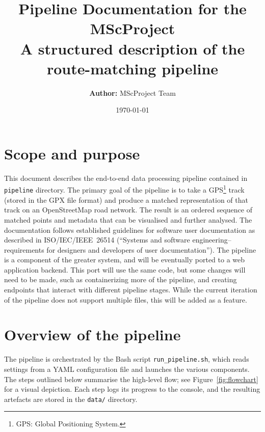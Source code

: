 \documentclass[12pt,a4paper]{article}
\title{Pipeline Documentation for the MScProject\\[0.5em]
\large A structured description of the route-matching pipeline}
\author{\textbf{Author:} MScProject Team}
\date{\today}
\begin{document}
\maketitle

\section*{Scope and purpose}
This document describes the end-to-end data processing pipeline contained in \texttt{pipeline}
directory.  The primary goal of the pipeline is to take a
GPS\footnote{GPS: Global Positioning System.} track (stored in the GPX file
format) and produce a matched representation of that track on an
OpenStreetMap road network.  The result is an ordered sequence of matched
points and metadata that can be visualised and further analysed.  The
documentation follows established guidelines for software user documentation as
described in ISO/IEC/IEEE~26514 (``Systems and software engineering--requirements
for designers and developers of user documentation''). The pipeline is a component
of the greater system, and will be eventually ported to a web application backend. This
port will use the same code, but some changes will need to be made, such as containerizing
more of the pipeline, and creating endpoints that interact with different pipeline stages.
While the current iteration of the pipeline does not support multiple files, this will be added as a feature.

\section{Overview of the pipeline}
The pipeline is orchestrated by the Bash script \texttt{run\_pipeline.sh}, which
reads settings from a YAML configuration file and launches the various
components.  The steps outlined below summarise the high-level flow; see
Figure~\ref{fig:flowchart} for a visual depiction.  Each step logs its
progress to the console, and the resulting artefacts are stored in the
\texttt{data/} directory.
\end{document}
